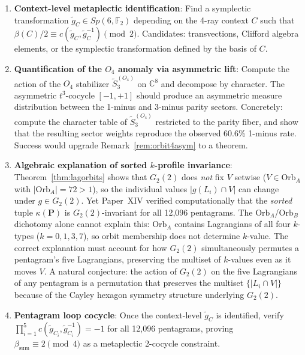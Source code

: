 \documentclass[11pt,a4paper]{article}
\theoremstyle{remark}
\begin{document}
\begin{enumerate}
  \item \textbf{Context-level metaplectic identification}:
        Find a symplectic transformation $\tilde{g}_C \in Sp(6,\mathbb{F}_2)$
        depending on the 4-ray context $C$ such that
        $\beta(C)/2 \equiv c(\tilde{g}_C, \tilde{g}_C^{-1}) \pmod 2$.
        Candidates: transvections, Clifford algebra elements, or the
        symplectic transformation defined by the basis of $C$.

  \item \textbf{Quantification of the $O_4$ anomaly via asymmetric lift}:
        Compute the action of the $O_4$ stabilizer $\widetilde{S}_3^{(O_4)}$
        on $\mathbb{C}^8$ and decompose by character.
        The asymmetric $t^3$-cocycle $[-1,+1]$ should produce an asymmetric
        measure distribution between the 1-minus and 3-minus parity sectors.
        Concretely: compute the character table of $\widetilde{S}_3^{(O_4)}$
        restricted to the parity fiber, and show that the resulting sector
        weights reproduce the observed 60.6\% 1-minus rate.
        Success would upgrade Remark~\ref{rem:orbit4asym} to a theorem.

  \item \textbf{Algebraic explanation of sorted $k$-profile invariance}:
        Theorem~\ref{thm:lagorbits} shows that $G_2(2)$ does \emph{not} fix
        $V$ setwise ($V \in \mathrm{Orb}_A$ with $|\mathrm{Orb}_A| = 72 > 1$),
        so the individual values $|g(L_i) \cap V|$ can change under
        $g \in G_2(2)$.
        Yet Paper~XIV verified computationally that the \emph{sorted} tuple
        $\kappa(\mathbf{P})$ is $G_2(2)$-invariant for all 12{,}096 pentagrams.
        The $\mathrm{Orb}_A$/$\mathrm{Orb}_B$ dichotomy alone cannot explain
        this: $\mathrm{Orb}_A$ contains Lagrangians of all four $k$-types
        ($k = 0, 1, 3, 7$), so orbit membership does not determine $k$-value.
        The correct explanation must account for how $G_2(2)$ simultaneously
        permutes a pentagram's five Lagrangians, preserving the multiset of
        $k$-values even as it moves $V$.
        A natural conjecture: the action of $G_2(2)$ on the five Lagrangians
        of any pentagram is a permutation that preserves the multiset
        $\{|L_i \cap V|\}$ because of the Cayley hexagon symmetry structure
        underlying $G_2(2)$.

  \item \textbf{Pentagram loop cocycle}:
        Once the context-level $\tilde{g}_C$ is identified, verify
        $\prod_{i=1}^5 c(\tilde{g}_{C_i}, \tilde{g}_{C_i}^{-1}) = -1$
        for all 12{,}096 pentagrams, proving
        $\beta_{\mathrm{sum}} \equiv 2 \pmod 4$ as a metaplectic 2-cocycle
        constraint.


\end{enumerate}
\end{document}
